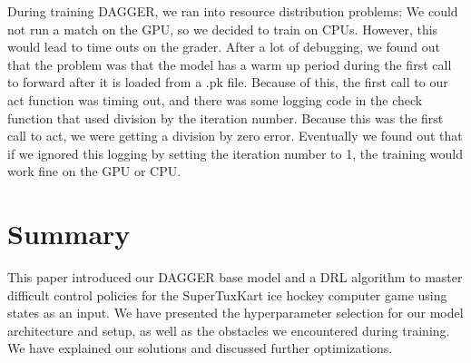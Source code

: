 \documentclass[10pt,twocolumn,letterpaper]{article}
\begin{document}
During training DAGGER, we ran into resource distribution problems: We could not run a match on the GPU, so we decided to train on CPUs. However, this would lead to time outs on the grader. After a lot of debugging, we found out that the problem was that the model has a warm up period during the first call to forward after it is loaded from a .pk file. Because of this, the first call to our act function was timing out, and there was some logging code in the check function that used division by the iteration number. Because this was the first call to act, we were getting a division by zero error. Eventually we found out that if we ignored this logging by setting the iteration number to 1, the training would work fine on the GPU or CPU.

\section{Summary}
This paper introduced our DAGGER base model and a DRL algorithm to master difficult control policies for the SuperTuxKart ice hockey computer game using states as an input. We have presented the hyperparameter selection for our model architecture and setup, as well as the obstacles we encountered during training. We have explained our solutions and discussed further optimizations.
\end{document}
